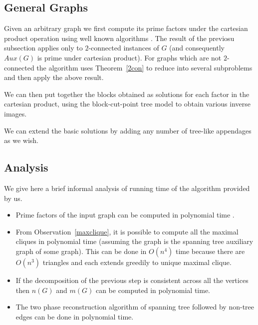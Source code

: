 \documentclass{llncs}
\begin{document}
\subsection{General Graphs}
Given an arbitrary graph we first compute its prime factors under the cartesian product operation using well known algorithms  \cite{factoralgpap}. The result of the previosu subsection applies only to $2$-connected instances of $G$ (and consequently $Aux(G)$ is prime under cartesian product). For graphs which are not $2$-connected the algorithm uses Theorem~\ref{2con} to reduce into several subproblems and then apply the above result. 

We can then put together the blocks obtained as solutions for each factor in the cartesian product, using the block-cut-point tree model to obtain various inverse images.

We can extend the basic solutions by adding any number of tree-like appendages as we wish.

\subsection{Analysis}
We give here a brief informal analysis of running time of the algorithm provided by us. 
\begin{itemize}
	\item Prime factors of the input graph can be computed in polynomial time  \cite{feigenbaum1985polynomial}.
	\item From Observation~\ref{maxclique}, it is possible to compute all the maximal cliques in polynomial time (assuming the graph is the spanning tree auxiliary graph of some graph). This can be done in $O(n^4)$ time because there are $O(n^3)$ triangles and each extends greedily to unique  maximal clique.
	\item If the decomposition of the previous step is consistent across all the vertices then $n(G)$ and $m(G)$ can be computed in polynomial time.
	\item The two phase reconstruction algorithm of spanning tree followed by non-tree edges can be done in polynomial time.
\end{itemize}
\end{document}
